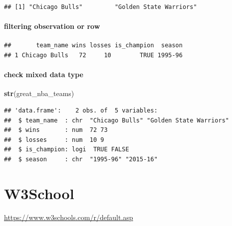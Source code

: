 \documentclass[
]{book}
\newenvironment{Shaded}{\begin{snugshade}}{\end{snugshade}}
\newcommand{\ConstantTok}[1]{\textcolor[rgb]{0.56,0.35,0.01}{#1}}
\newcommand{\FunctionTok}[1]{\textcolor[rgb]{0.13,0.29,0.53}{\textbf{#1}}}
\newcommand{\NormalTok}[1]{#1}
\newcommand{\OtherTok}[1]{\textcolor[rgb]{0.56,0.35,0.01}{#1}}
\newcommand{\SpecialCharTok}[1]{\textcolor[rgb]{0.81,0.36,0.00}{\textbf{#1}}}
\theoremstyle{definition}
\theoremstyle{definition}
\theoremstyle{definition}
\theoremstyle{definition}
\theoremstyle{remark}
\begin{document}
\begin{verbatim}
## [1] "Chicago Bulls"         "Golden State Warriors"
\end{verbatim}

\hypertarget{filtering-observation-or-row}{%
\paragraph{filtering observation or row}\label{filtering-observation-or-row}}

\begin{Shaded}
\end{Shaded}

\begin{verbatim}
##       team_name wins losses is_champion  season
## 1 Chicago Bulls   72     10        TRUE 1995-96
\end{verbatim}

\hypertarget{check-mixed-data-type}{%
\paragraph{check mixed data type}\label{check-mixed-data-type}}

\begin{Shaded}
\begin{Highlighting}[]
\FunctionTok{str}\NormalTok{(great\_nba\_teams)}
\end{Highlighting}
\end{Shaded}

\begin{verbatim}
## 'data.frame':    2 obs. of  5 variables:
##  $ team_name  : chr  "Chicago Bulls" "Golden State Warriors"
##  $ wins       : num  72 73
##  $ losses     : num  10 9
##  $ is_champion: logi  TRUE FALSE
##  $ season     : chr  "1995-96" "2015-16"
\end{verbatim}

\hypertarget{w3school}{%
\section{W3School}\label{w3school}}

\url{https://www.w3schools.com/r/default.asp}
\end{document}
